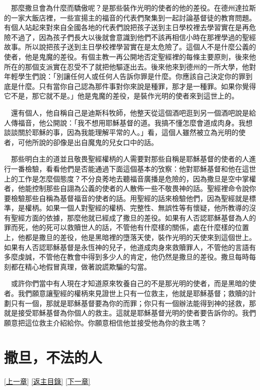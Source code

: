 \documentclass{book}
\begin{document}
　那麼撒旦會為什麼而驕傲呢？是那些裝作光明的使者的他的差役。在德州達拉斯的一家大飯店裡，一些宣揚主的福音的代表們聚集到一起討論基督徒的教育問題。有個人站起來對來自全國各地的代表們說把孩子送到主日學校裡去學習實在是再危險不過了，因為孩子們長大以後就會意識到他們不該再相信小時在那裡學過的聖經故事。所以說把孩子送到主日學校裡學習實在是太危險了。這個人不是什麼公義的使者，他是鬼魔的差役。有個主教一再公開地否定聖經裡的每條主要原則，後來他所在的那個支派實在忍受不了就把他驅逐出去。後來他來到德州的一所大學，他對年輕學生們說：「別讓任何人或任何人告訴你罪是什麼。你應該自己決定你的罪到底是什麼。只有當你自己認為那件事對你來說是種罪，那才是一種罪。如果你覺得它不是，那它就不是。」他是鬼魔的差役，是裝作光明的使者來到這世上的。

　還有個人，他自稱自己是迪斯科牧師，他整天從這個酒吧逛到另一個酒吧說是給人傳福音，他公開說：「我不想用耶穌基督的道。我搞不懂怎麼會道成肉身。我想談談關於耶穌的事，因為我能理解平常的人。」看，這個人雖然被立為光明的使者，可他所說的卻像是出自魔鬼的兒女口中的話。

　那些明白主的道並且敬畏聖經權柄的人需要對那些自稱是耶穌基督的使者的人進行一番檢驗，看看他們是否能通過下面這個基本的攷察：他對耶穌基督和他在這世上的工作是怎麼個態度？不分良莠地去聽福音廣播是危險的，因為撒旦是空中掌權者，他能控制那些自詡為公義的使者的人散佈一些不敬畏神的話。聖經裡命令說你要檢驗那些自稱為基督福音的使者的話。用聖經的話來檢驗他們，因為聖經就是標準，是權柄。如果一個人對聖經的權柄、完整性、無誤性等有懷疑，他所教導的沒有聖經方面的依據，那麼他就已經成了撒旦的差役。如果有人否認耶穌基督為人的罪而死，他的死可以救贖世人的話，不管他有什麼樣的關係，處在什麼樣的位置上，他都是撒旦的差役，他是黑暗裡的墮落天使，裝作光明的天使來到這個世上。如果有人否認耶穌基督是永恆神的兒子，他道成肉身來救贖罪人，不管他的言語有多麼虔誠，不管他在教會中得到多少人的肯定，他仍然是撒旦的差役。撒旦每時每刻都在精心地假冒真理，做著說謊欺騙的勾當。

　或許你們當中有人現在才知道原來牧養自己的不是那光明的使者，而是黑暗的使者。我們願意讓聖經的權柄來見證世上只有一位救主，他就是耶穌基督；救贖的計劃只有一個，那就是耶穌基督要為你的而罪；你只有一個辦法能得到神的拯救，那就是接受耶穌基督為你個人的救主。這就是耶穌基督光明的使者要告訴你的。我們願意把這位救主介紹給你。你願意相信他並接受他為你的救主嗎？

\chapter{撒旦，不法的人}
\label{sec:ch08}
\hyperref[sec:ch07]{[上一章]}
\hyperlink{toc}{[返主目錄]}
\hyperref[sec:ch09]{[下一章]}
\end{document}
